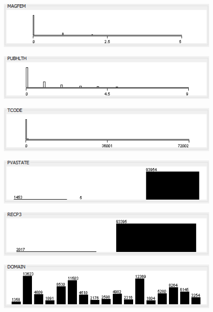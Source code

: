 \begin{figure}
\includegraphics{./images/expl_rep/Cattura-01-08}
\end{figure}
\begin{figure}
\includegraphics{./images/expl_rep/Cattura-01-09}
\end{figure}
\begin{figure}
\includegraphics{./images/expl_rep/Cattura-02-00}
\end{figure}
\begin{figure}
\includegraphics{./images/expl_rep/Cattura-02-01}
\end{figure}
\begin{figure}
\includegraphics{./images/expl_rep/Cattura-02-02}
\end{figure}
\begin{figure}
\includegraphics{./images/expl_rep/Cattura-02-03}
\end{figure}
